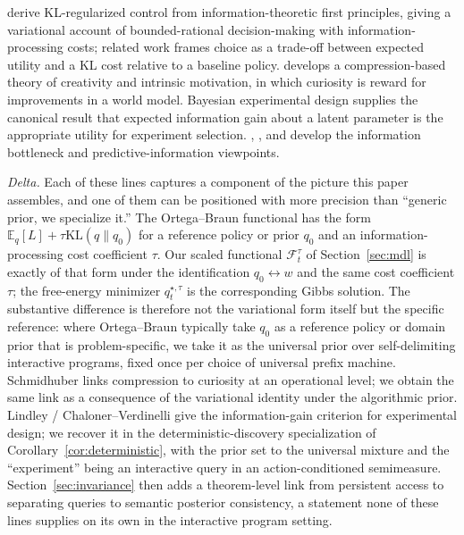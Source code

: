 \documentclass[11pt]{article}
\theoremstyle{remark}
\newcommand{\Fcal}{\mathcal{F}}
\newcommand{\E}{\mathbb{E}}
\newcommand{\KL}{\mathrm{KL}}
\begin{document}
\citet{OrtegaBraun2013} derive KL-regularized control from information-theoretic first principles, giving a variational account of bounded-rational decision-making with information-processing costs; related work \citep{OrtegaBraun2011,Tishby2011} frames choice as a trade-off between expected utility and a KL cost relative to a baseline policy. \citet{Schmidhuber2010,Schmidhuber1991} develops a compression-based theory of creativity and intrinsic motivation, in which curiosity is reward for improvements in a world model. Bayesian experimental design \citep{Lindley1956,ChalonerVerdinelli1995,MacKay1992} supplies the canonical result that expected information gain about a latent parameter is the appropriate utility for experiment selection. \citet{BialekNemenmanTishby2001}, \citet{TishbyPereiraBialek1999}, and \citet{StillCrutchfield2007} develop the information bottleneck and predictive-information viewpoints.

\textit{Delta.} Each of these lines captures a component of the picture this paper assembles, and one of them can be positioned with more precision than ``generic prior, we specialize it.'' The Ortega--Braun functional has the form \(\E_q[L] + \tau \KL(q \| q_0)\) for a reference policy or prior \(q_0\) and an information-processing cost coefficient \(\tau\). Our scaled functional \(\Fcal_t^\tau\) of Section~\ref{sec:mdl} is exactly of that form under the identification \(q_0 \leftrightarrow w\) and the same cost coefficient \(\tau\); the free-energy minimizer \(q_t^{\star,\tau}\) is the corresponding Gibbs solution. The substantive difference is therefore not the variational form itself but the specific reference: where Ortega--Braun typically take \(q_0\) as a reference policy or domain prior that is problem-specific, we take it as the universal prior over self-delimiting interactive programs, fixed once per choice of universal prefix machine. Schmidhuber links compression to curiosity at an operational level; we obtain the same link as a consequence of the variational identity under the algorithmic prior. Lindley / Chaloner--Verdinelli give the information-gain criterion for experimental design; we recover it in the deterministic-discovery specialization of Corollary~\ref{cor:deterministic}, with the prior set to the universal mixture and the ``experiment'' being an interactive query in an action-conditioned semimeasure. Section~\ref{sec:invariance} then adds a theorem-level link from persistent access to separating queries to semantic posterior consistency, a statement none of these lines supplies on its own in the interactive program setting.
\end{document}
